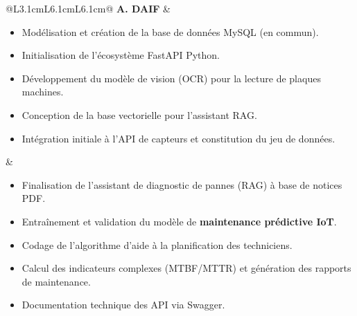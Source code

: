 \documentclass[11pt,a4paper]{article}
\begin{document}
\begin{longtable}{@{}L{3.1cm}L{6.1cm}L{6.1cm}@{}}
\textbf{A. DAIF} &
\begin{minipage}[t]{\linewidth}\vspace{2pt}
\begin{itemize}[leftmargin=1em, itemsep=2pt, topsep=0pt]
  \item Modélisation et création de la base de données MySQL (en commun).
  \item Initialisation de l'écosystème FastAPI Python.
  \item Développement du modèle de vision (OCR) pour la lecture de plaques machines.
  \item Conception de la base vectorielle pour l'assistant RAG.
  \item Intégration initiale à l'API de capteurs et constitution du jeu de données.
\end{itemize}\vspace{2pt}
\end{minipage} &
\begin{minipage}[t]{\linewidth}\vspace{2pt}
\begin{itemize}[leftmargin=1em, itemsep=2pt, topsep=0pt]
  \item Finalisation de l'assistant de diagnostic de pannes (RAG) à base de notices PDF.
  \item Entraînement et validation du modèle de \textbf{maintenance prédictive IoT}.
  \item Codage de l'algorithme d'aide à la planification des techniciens.
  \item Calcul des indicateurs complexes (MTBF/MTTR) et génération des rapports de maintenance.
  \item Documentation technique des API via Swagger.
\end{itemize}\vspace{2pt}
\end{minipage} \\


\end{longtable}
\end{document}
